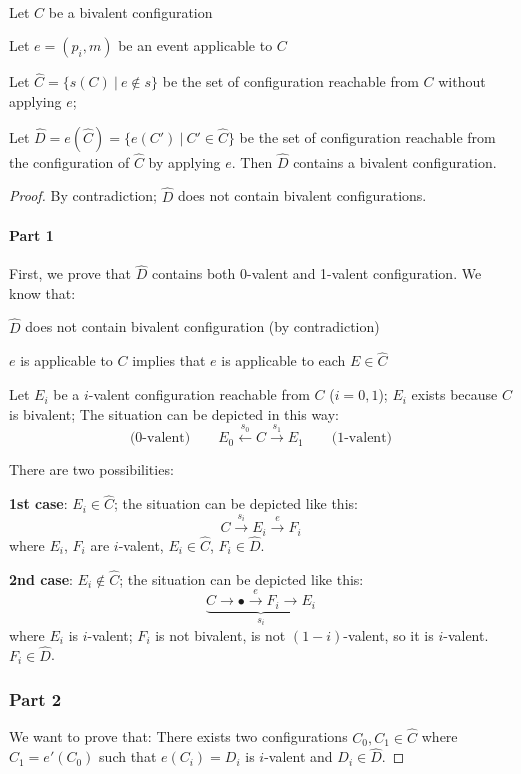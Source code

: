 \documentclass[12pt]{article}
\begin{document}
\begin{lemma}~
\BI
\item Let $C$ be a bivalent configuration
\item Let $e=(p_i,m)$ be an event applicable to $C$
\item Let $\hat{C} = \{ s(C) ~|~ e \not\in s \}$ be the set of configuration reachable from $C$ without applying $e$;
\item Let $\hat{D} = e(\hat{C}) = \{ e(C') ~|~ C' \in \hat{C} \}$ be the set of configuration reachable from the configuration
  of $\hat{C}$ by applying $e$.
\EI
Then $\hat{D}$ contains a bivalent configuration.
\end{lemma}

\begin{proof}
By contradiction; $\hat{D}$ does not contain bivalent configurations.

\paragraph{Part 1}
First, we prove that $\hat{D}$ contains both 0-valent and 1-valent configuration. We know that:
\BI
\item $\hat{D}$ does not contain bivalent configuration (by contradiction)
\item $e$ is applicable to $C$ implies that $e$ is applicable to each $E \in \hat{C}$
\item Let $E_i$ be a $i$-valent configuration reachable from $C$ ($i=0,1$); $E_i$ exists
  because $C$ is bivalent;
\EI
The situation can be depicted in this way:
\[
  \text{(0-valent)} \qquad E_0 \xleftarrow{s_0} C \xrightarrow{s_1} E_1 \qquad \text{(1-valent)}
\]

There are two possibilities:
\BI
\item {\bf 1st case}:  
$E_i \in \hat{C}$; the situation can be depicted like this:
\[
  C \xrightarrow{s_i} E_i \xrightarrow{e} F_i
\]
where $E_i$, $F_i$ are $i$-valent, $E_i \in \hat{C}$, $F_i \in \hat{D}$.

\item {\bf 2nd case}:
$E_i \not\in \hat{C}$; the situation can be depicted like this:
\[
  \underbrace{ C \rightarrow \bullet \xrightarrow{e} F_i \rightarrow E_i}_{s_i}
\]
where $E_i$ is $i$-valent; $F_i$ is not bivalent, is not $(1-i)$-valent, so it is
$i$-valent. $F_i \in \hat{D}$.
\EI 

\newpage

\subsubsection*{Part 2}
We want to prove that:
  There exists two configurations $C_0, C_1 \in \hat{C}$ where $C_1=e'(C_0)$ such that
  $e(C_i)=D_i$ is $i$-valent and $D_i \in \hat{D}$.


\end{proof}
\end{document}

